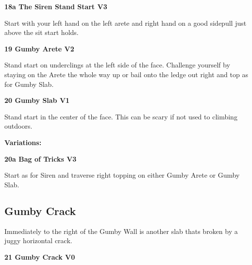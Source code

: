\begin{multicols}{2}
\begin{adjustwidth}{0.5cm}{}
					\label{vr:The Siren Stand Start}
\colorbox{green!20}{
\parbox{0.95\linewidth}{
\textbf{
18a The Siren Stand Start V3  
}
}
}

					\begin{adjustwidth}{0.5cm}{}				
					Start with your left hand on the left arete and right hand on a good sidepull just above the sit start holds.
					\end{adjustwidth}
				\end{adjustwidth}
			\label{rt:Gumby Arete}
\colorbox{green!20}{
\parbox{0.95\linewidth}{
\textbf{
19 Gumby Arete V2  
}
}
}

			\begin{adjustwidth}{0.5cm}{}				
			Stand start on underclings at the left side of the face. Challenge yourself by staying on the Arete the whole way up or bail onto the ledge out right and top as for Gumby Slab.
			\end{adjustwidth}
			\label{rt:Gumby Slab}
\colorbox{green!20}{
\parbox{0.95\linewidth}{
\textbf{
20 Gumby Slab V1  
}
}
}

			\begin{adjustwidth}{0.5cm}{}				
			Stand start in the center of the face. This can be scary if not used to climbing outdoors.
			\end{adjustwidth}
				\begin{adjustwidth}{0.5cm}{}				
				\textbf{Variations:} \newline

					\label{vr:Bag of Tricks}
\colorbox{green!20}{
\parbox{0.95\linewidth}{
\textbf{
20a Bag of Tricks V3  
}
}
}

					\begin{adjustwidth}{0.5cm}{}				
					Start as for Siren and traverse right topping on either Gumby Arete or Gumby Slab.
					\end{adjustwidth}
				\end{adjustwidth}
		\subsection*{Gumby Crack}\label{bf:Gumby Crack}
		Immediately to the right of the Gumby Wall is another slab thats broken by a juggy horizontal crack.\\
	
			\label{rt:Gumby Crack}
\colorbox{green!20}{
\parbox{0.95\linewidth}{
\textbf{
21 Gumby Crack V0  
}
}
}


\end{multicols}
